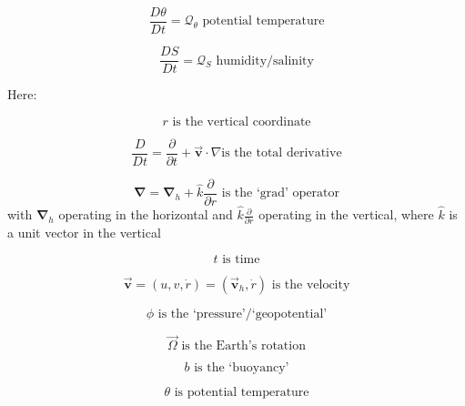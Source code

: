 \begin{equation}
\frac{D\theta }{Dt}=\mathcal{Q}_{\theta }\text{ potential temperature}
\label{eq:potential_temperature}
\end{equation}

\begin{equation}
\frac{DS}{Dt}=\mathcal{Q}_{S}\text{ humidity/salinity}
\label{eq:humidity_salt}
\end{equation}

Here:

\begin{equation*}
r\text{ is the vertical coordinate}
\end{equation*}

\begin{equation*}
\frac{D}{Dt}=\frac{\partial }{\partial t}+\vec{\mathbf{v}}\cdot \nabla \text{
is the total derivative}
\end{equation*}

\begin{equation*}
\mathbf{\nabla }=\mathbf{\nabla }_{h}+\widehat{k}\frac{\partial }{\partial r}
\text{ is the `grad' operator}
\end{equation*}
with $\mathbf{\nabla }_{h}$ operating in the horizontal and $\widehat{k}
\frac{\partial }{\partial r}$ operating in the vertical, where $\widehat{k}$
is a unit vector in the vertical

\begin{equation*}
t\text{ is time}
\end{equation*}

\begin{equation*}
\vec{\mathbf{v}}=(u,v,\dot{r})=(\vec{\mathbf{v}}_{h},\dot{r})\text{ is the
velocity}
\end{equation*}

\begin{equation*}
\phi \text{ is the `pressure'/`geopotential'}
\end{equation*}

\begin{equation*}
\vec{\Omega}\text{ is the Earth's rotation}
\end{equation*}

\begin{equation*}
b\text{ is the `buoyancy'}
\end{equation*}

\begin{equation*}
\theta \text{ is potential temperature}
\end{equation*}

